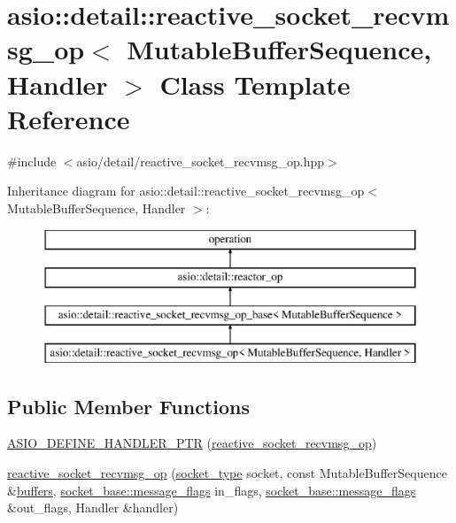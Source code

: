 \hypertarget{classasio_1_1detail_1_1reactive__socket__recvmsg__op}{}\section{asio\+:\+:detail\+:\+:reactive\+\_\+socket\+\_\+recvmsg\+\_\+op$<$ Mutable\+Buffer\+Sequence, Handler $>$ Class Template Reference}
\label{classasio_1_1detail_1_1reactive__socket__recvmsg__op}


{\ttfamily \#include $<$asio/detail/reactive\+\_\+socket\+\_\+recvmsg\+\_\+op.\+hpp$>$}

Inheritance diagram for asio\+:\+:detail\+:\+:reactive\+\_\+socket\+\_\+recvmsg\+\_\+op$<$ Mutable\+Buffer\+Sequence, Handler $>$\+:\begin{figure}[H]
\begin{center}
\leavevmode
\includegraphics[height=4.000000cm]{classasio_1_1detail_1_1reactive__socket__recvmsg__op}
\end{center}
\end{figure}
\subsection*{Public Member Functions}
\begin{DoxyCompactItemize}
\item 
\hyperlink{classasio_1_1detail_1_1reactive__socket__recvmsg__op_a4b956d4650176bbfa199ce37a9b73d22}{A\+S\+I\+O\+\_\+\+D\+E\+F\+I\+N\+E\+\_\+\+H\+A\+N\+D\+L\+E\+R\+\_\+\+P\+T\+R} (\hyperlink{classasio_1_1detail_1_1reactive__socket__recvmsg__op}{reactive\+\_\+socket\+\_\+recvmsg\+\_\+op})
\item 
\hyperlink{classasio_1_1detail_1_1reactive__socket__recvmsg__op_a7aa8dcf508b34cd6521c7cf188f39884}{reactive\+\_\+socket\+\_\+recvmsg\+\_\+op} (\hyperlink{namespaceasio_1_1detail_a6798c771dd84b79798b1a08150706ea9}{socket\+\_\+type} socket, const Mutable\+Buffer\+Sequence \&\hyperlink{group__async__read_ga54dede45c3175148a77fe6635222c47d}{buffers}, \hyperlink{classasio_1_1socket__base_ac3cf77465dfedfe1979b5415cf32cc94}{socket\+\_\+base\+::message\+\_\+flags} in\+\_\+flags, \hyperlink{classasio_1_1socket__base_ac3cf77465dfedfe1979b5415cf32cc94}{socket\+\_\+base\+::message\+\_\+flags} \&out\+\_\+flags, Handler \&handler)
\end{DoxyCompactItemize}
